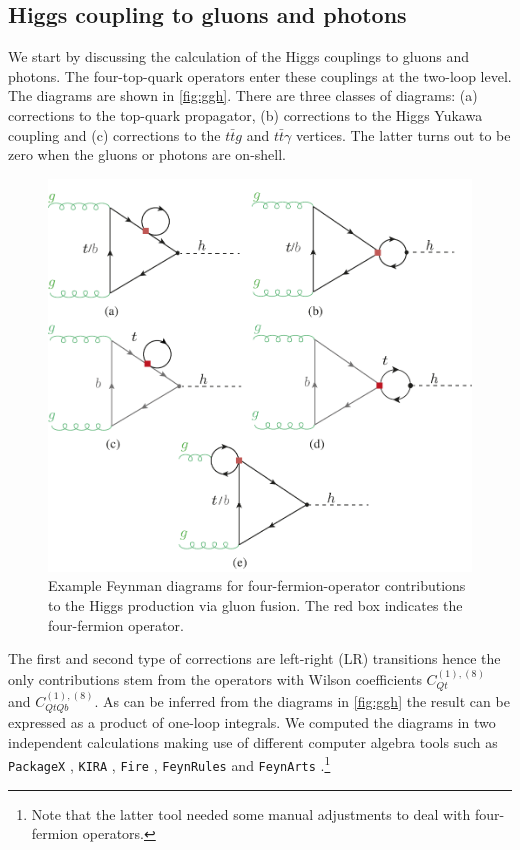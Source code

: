
\subsection{Higgs coupling to gluons and photons}

We start by discussing the calculation of the Higgs couplings to gluons and photons. The four-top-quark operators enter these couplings at the two-loop level. The diagrams are shown in \autoref{fig:ggh}. There are three classes of diagrams: (a) corrections to the top-quark propagator, (b) corrections to the Higgs Yukawa coupling and (c) corrections to the $t\bar{t}g$ and $t\bar{t}\gamma$ vertices. The latter turns out to be zero when the gluons or photons are on-shell.
\begin{figure}[t!]
	\begin{center}
		\includegraphics[width=12cm]{fig/ggF-4F_NLO.pdf}
		\caption{Example Feynman diagrams for four-fermion-operator contributions to the Higgs production via gluon fusion. The red box indicates the four-fermion operator.\label{fig:ggh} }
	\end{center}
\end{figure}
The first and second type of corrections are left-right (LR) transitions hence the only contributions stem from the operators with Wilson coefficients $C_{Qt}^{(1),(8)}$ and $C^{(1),(8)}_{QtQb}$.
As can be inferred from the diagrams in \autoref{fig:ggh} the result can be expressed as a product of one-loop integrals. We computed the diagrams in two independent calculations making use of different computer algebra tools such as \texttt{PackageX} \cite{Patel:2015tea}, \texttt{KIRA} \cite{Maierhoefer:2017hyi}, \texttt{Fire} \cite{Smirnov:2008iw}, \texttt{FeynRules} \cite{Alloul:2013bka} and \texttt{FeynArts} \cite{Hahn:2000kx}.\footnote{Note that the latter tool needed some manual adjustments to deal with four-fermion operators.}  
